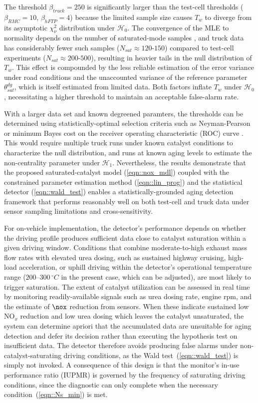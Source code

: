 The threshold $\beta_{truck} = 250$ is significantly larger than the test-cell thresholds ($\beta_{RMC} = 10$,
$\beta_{hFTP} = 4$) because the limited sample size causes $T_w$ to diverge from its asymptotic $\chi^2_\nu$
distribution under $\mathcal{H}_0$. The convergence of the MLE to normality depends on the number of saturated-mode
samples \cite{kay1993estimation}, and truck data has considerably fewer such samples ($N_{sat} \approx 120$-$150$)
compared to test-cell experiments ($N_{sat} \approx 200$-$500$), resulting in heavier tails in the null distribution of
$T_w$. This effect is compounded by the less reliable estimation of the error variance under road conditions and the
unaccounted variance of the reference parameter $\theta_{sat}^{dg}$, which is itself estimated from limited data. Both
factors inflate $T_w$ under $\mathcal{H}_0$, necessitating a higher threshold to maintain an acceptable false-alarm
rate.

With a larger data set and known degreened paramters, the thresholds can be determined using statistically-optimal
selection criteria such as Neyman-Pearson \cite{kay1998detection} or minimum Bayes cost on the receiver operating
characteristic (ROC) curve \cite{PoorDetection}. This would require multiple truck runs under known catalyst conditions
to characterize the null distribution, and runs at known aging levels to estimate the non-centrality parameter under
$\mathcal{H}_1$. Nevertheless, the results demonstrate that the proposed saturated-catalyst model (\ref{eqn::nox_mdl})
coupled with the constrained parameter estimation method (\ref{eqn::lin_prog}) and the statistical detector
(\ref{eqn::wald_test}) enables a statistically-grounded aging detection framework that performs reasonably well on both
test-cell and truck data under sensor sampling limitations and cross-sensitivity.

For on-vehicle implementation, the detector's performance depends on whether the driving profile produces sufficient
data close to catalyst saturation within a given driving window. Conditions that combine moderate-to-high exhaust mass
flow rates with elevated urea dosing, such as sustained highway cruising, high-load acceleration, or uphill driving
within the detector's operational temperature range ($200$--$300\,^\circ C$ in the present case, which can be adjusted),
are most likely to trigger saturation. The extent of catalyst utilization can be assessed in real time by monitoring
readily-available signals such as urea dosing rate, engine rpm, and the estimate of $\nox$ reduction from sensors. When
these indicate sustained low $\text{NO}_x$ reduction and low urea dosing which leaves the catalyst unsaturated, the
system can determine apriori that the accumulated data are unsuitable for aging detection and defer its decision rather
than executing the hypothesis test on insufficient data. The detector therefore avoids producing false alarms under
non-catalyst-saturating driving conditions, as the Wald test~(\ref{eqn::wald_test}) is simply not invoked. A consequence
of this design is that the monitor's in-use performance ratio (IUPMR) is governed by the frequency of saturating driving
conditions, since the diagnostic can only complete when the necessary condition~(\ref{eqn::Ns_min}) is met.


